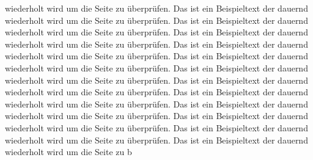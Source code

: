 wiederholt wird um die Seite zu überprüfen. Das ist ein Beispieltext der dauernd wiederholt wird um die Seite zu überprüfen. Das ist ein Beispieltext der dauernd wiederholt wird um die Seite zu überprüfen. Das ist ein Beispieltext der dauernd wiederholt wird um die Seite zu überprüfen. Das ist ein Beispieltext der dauernd wiederholt wird um die Seite zu überprüfen. Das ist ein Beispieltext der dauernd wiederholt wird um die Seite zu überprüfen. Das ist ein Beispieltext der dauernd wiederholt wird um die Seite zu überprüfen. Das ist ein Beispieltext der dauernd wiederholt wird um die Seite zu überprüfen. Das ist ein Beispieltext der dauernd wiederholt wird um die Seite zu überprüfen. Das ist ein Beispieltext der dauernd wiederholt wird um die Seite zu überprüfen. Das ist ein Beispieltext der dauernd wiederholt wird um die Seite zu überprüfen. Das ist ein Beispieltext der dauernd wiederholt wird um die Seite zu überprüfen. Das ist ein Beispieltext der dauernd wiederholt wird um die Seite zu b